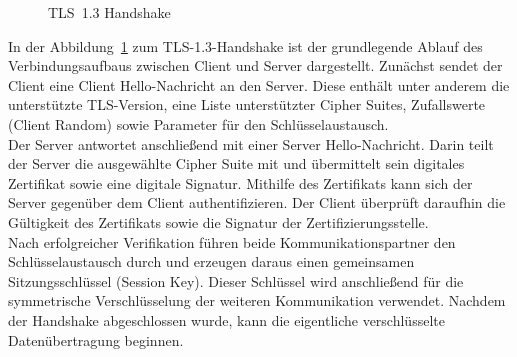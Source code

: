 \begin{figure}[htp]
{
}
\caption{TLS~1.3 Handshake}
\label{fig:tls13-handshake}
\end{figure}

In der Abbildung~\ref{fig:tls13-handshake} zum TLS-1.3-Handshake ist der grundlegende Ablauf des Verbindungsaufbaus zwischen Client und Server dargestellt. Zunächst sendet der Client eine Client Hello-Nachricht an den Server. Diese enthält unter anderem die unterstützte TLS-Version, eine Liste unterstützter Cipher Suites, Zufallswerte (Client Random) sowie Parameter für den Schlüsselaustausch. \\
Der Server antwortet anschließend mit einer Server Hello-Nachricht. Darin teilt der Server die ausgewählte Cipher Suite mit und übermittelt sein digitales Zertifikat sowie eine digitale Signatur. Mithilfe des Zertifikats kann sich der Server gegenüber dem Client authentifizieren. Der Client überprüft daraufhin die Gültigkeit des Zertifikats sowie die Signatur der Zertifizierungsstelle. \\
Nach erfolgreicher Verifikation führen beide Kommunikationspartner den Schlüsselaustausch durch und erzeugen daraus einen gemeinsamen Sitzungsschlüssel (Session Key). Dieser Schlüssel wird anschließend für die symmetrische Verschlüsselung der weiteren Kommunikation verwendet. Nachdem der Handshake abgeschlossen wurde, kann die eigentliche verschlüsselte Datenübertragung beginnen.


